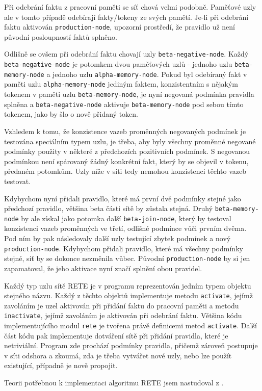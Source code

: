 Při odebrání faktu z pracovní paměti se síť chová velmi podobně. Paměťové uzly
ale v tomto případě odebírají fakty/tokeny ze svých pamětí.
Je-li při odebrání faktu aktivován \verb|production-node|, upozorní prostředí,
že pravidlo už není původní posloupností faktů splněno.

Odlišně se ovšem při odebrání faktu chovají uzly \verb|beta-negative-node|. Každý
\verb|beta-negative-node| je potomkem dvou paměťových uzlů - jednoho uzlu
\verb|beta-memory-node| a jednoho uzlu \verb|alpha-memory-node|. Pokud byl odebíraný
fakt v paměti uzlu \verb|alpha-memory-node| jediným faktem,
konzistentním s nějakým tokenem v paměti uzlu \verb|beta-memory-node|, je nyní negovaná podmínka
pravidla splněna a \verb|beta-negative-node| aktivuje \verb|beta-memory-node|
pod sebou tímto tokenem, jako by šlo o nově přidaný token.

Vzhledem k tomu, že konzistence vazeb proměnných negovaných podmínek je testována
speciálním typem uzlu, je třeba, aby byly všechny proměnné negované podmínky
použity v některé z předchozích pozitivních podmínek. S negovanou podmínkou není
spárovaný žádný konkrétní fakt, který by se objevil v tokenu, předaném potomkům.
Uzly níže v síti tedy nemohou konzistenci těchto vazeb testovat.

Kdybychom nyní přidali pravidlo, které má první dvě podmínky stejné jako
předchozí pravidlo, většina beta části sítě by zůstala stejná. Druhý
\verb|beta-memory-node| by ale získal jako potomka další \verb|beta-join-node|,
který by testoval konzistenci vazeb proměnných ve třetí, odlišné podmínce vůči
prvním dvěma. Pod ním by pak následovaly další uzly testující zbytek podmínek a
nový \verb|production-node|. Kdybychom přidali pravidlo, které má všechny
podmínky stejné, síť by se dokonce nezměnila vůbec. Původní
\verb|production-node| by si jen zapamatoval, že jeho aktivace nyní značí
splnění obou pravidel.

Každý typ uzlu sítě RETE je v programu reprezentován jedním typem objektu
stejného názvu. Každý z těchto objektů implementuje metodu \verb|activate|,
jejímž zavoláním je uzel aktivován při přidání faktu do pracovní paměti a metodu
\verb|inactivate|, jejímž zavoláním je aktivován při odebrání faktu. Většina
kódu implementujícího modul \verb|rete| je tvořena právě definicemi metod
\verb|activate|. Další část kódu pak implementuje dotváření sítě při přidání
pravidla, které je netriviální.  Program zde prochází podmínky pravidla, přičemž
zároveň postupuje v síti odshora a zkoumá, zda je třeba vytvářet nové uzly, nebo
lze použít existující, případně je nově propojit.

Teorii potřebnou k implementaci algoritmu RETE jsem nastudoval z \cite{doorenbos}.
